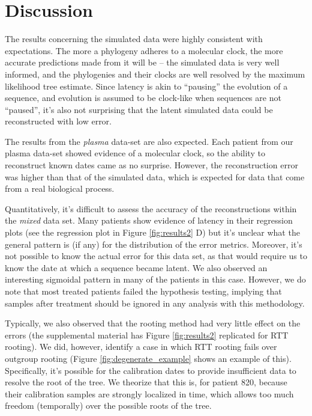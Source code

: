 \section * {Discussion} \label{sec:discuss}
The results concerning the simulated data were highly consistent with expectations. 
The more a phylogeny adheres to a molecular clock, the more accurate predictions made from it will be -- the simulated data is very well informed, and the phylogenies and their clocks are well resolved by the maximum likelihood tree estimate. 
Since latency is akin to ``pausing'' the evolution of a sequence, and evolution is assumed to be clock-like when sequences are not ``paused'', it's also not surprising that the latent simulated data could be reconstructed with low error. 

The results from the {\em plasma} data-set are also expected. 
Each patient from our plasma data-set showed evidence of a molecular clock, so the ability to reconstruct known dates came as no surprise. 
However, the reconstruction error was higher than that of the simulated data, which is expected for data that come from a real biological process.

Quantitatively, it's difficult to assess the accuracy of the reconstructions within the {\em mixed} data set. 
Many patients show evidence of latency in their regression plots (see the regression plot in Figure \ref{fig:results2} D) but it's unclear what the general pattern is (if any) for the distribution of the error metrics. 
Moreover, it's not possible to know the actual error for this data set, as that would require us to know the date at which a sequence became latent. 
We also observed an interesting sigmoidal pattern in many of the patients in this case.
However, we do note that most treated patients failed the hypothesis testing, implying that samples after treatment should be ignored in any analysis with this methodology.

Typically, we also observed that the rooting method had very little effect on the errors (the supplemental material has Figure \ref{fig:results2} replicated for RTT rooting). 
We did, however, identify a case in which RTT rooting fails over outgroup rooting (Figure \ref{fig:degenerate_example} shows an example of this). 
Specifically, it's possible for the calibration dates to provide insufficient data to resolve the root of the tree. 
We theorize that this is, for patient 820, because their calibration samples are strongly localized in time, which allows too much freedom (temporally) over the possible roots of the tree. 

